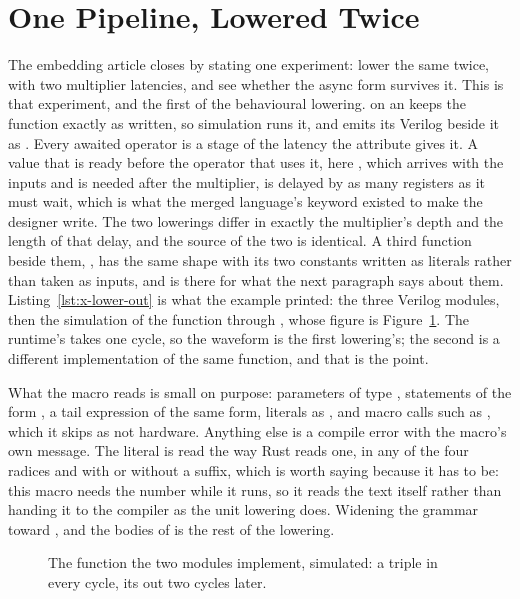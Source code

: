 \section{One Pipeline, Lowered Twice}
\label{sec:x-lower}

The embedding article closes by stating one experiment: lower the same
 twice, with two multiplier latencies, and see whether the
async form survives it. This is that experiment, and the first of the
behavioural lowering. \code{\#[pipeline(mul = 1, add = 1)]} on an
 keeps the function exactly as written, so simulation
runs it, and emits its Verilog beside it as .
Every awaited operator is a stage of the latency the attribute gives
it. A value that is ready before the operator that uses it, here
, which arrives with the inputs and is needed after the
multiplier, is delayed by as many registers as it must wait, which is
what the merged language's  keyword existed to make the
designer write. The two lowerings differ in exactly the multiplier's
depth and the length of that delay, and the source of the two is
identical. A third function beside them, , has the same
shape with its two constants written as literals rather than taken as
inputs, and is there for what the next paragraph says about them.
Listing~\ref{lst:x-lower-out} is what the example printed: the three
Verilog modules, then the simulation of the function through
, whose figure is Figure~\ref{fig:x-lower}. The
runtime's  takes one cycle, so the waveform is the first
lowering's; the second is a different implementation of the same
function, and that is the point.

What the macro reads is small on purpose: parameters of type
, statements of the form , a
tail expression of the same form, literals as ,
and macro calls such as , which it skips as not
hardware. Anything else is a compile error with the macro's own
message. The literal is read the way Rust reads one, in any of the
four radices and with or without a suffix, which is worth saying
because it has to be: this macro needs the number while it runs, so it
reads the text itself rather than handing it to the compiler as the
unit lowering does. Widening the grammar toward ,  and the
bodies of  is the rest of the lowering.

\begin{figure}[htbp]
\centering

\caption{The function the two modules implement, simulated: a triple in every cycle, its  out two cycles later.}
\label{fig:x-lower}
\end{figure}




